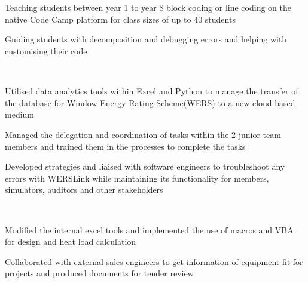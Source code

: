 \documentclass[11pt, a4paper]{MagicalCV}
\begin{document}
\begin{minipage}[t]{0.58\textwidth} 

\sectionsep \\ %
 \\
\vspace{\topsep} %
\begin{tightemize}
\item Teaching students between year 1 to year 8 block coding or line coding on the native Code Camp platform for class sizes of up to 40 students
\item Guiding students with decomposition and debugging errors and helping with customising their code
\end{tightemize}
\sectionsep

 \\
\vspace{\topsep} %
\begin{tightemize}
\item Utilised data analytics tools within Excel and Python to manage the transfer of the database for Window Energy Rating Scheme(WERS) to a new cloud based medium
\item Managed the delegation and coordination of tasks within the 2 junior team members and trained them in the processes to complete the tasks
\item Developed strategies and liaised with software engineers to troubleshoot any errors with WERSLink while maintaining its functionality for members, simulators, auditors and other stakeholders
\end{tightemize}
\sectionsep

 \\
\vspace{\topsep} %
\begin{tightemize}
\item Modified the internal excel tools and implemented the use of macros and VBA for design and heat load calculation
\item Collaborated with external sales engineers to get information of equipment fit for projects and produced documents for tender review
\end{tightemize}
\sectionsep


\end{minipage}
\end{document}
